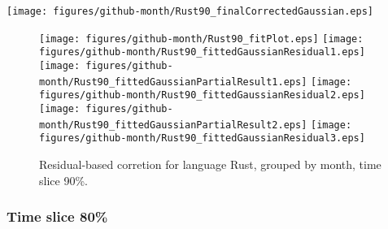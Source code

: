 \begin{center}
{\texttt{[image: figures/github-month/Rust90\_finalCorrectedGaussian.eps]}}
\end{center}

\FloatBarrier

\begin{figure}[t]
\centering
{}
{\texttt{[image: figures/github-month/Rust90\_fitPlot.eps]}}
{\texttt{[image: figures/github-month/Rust90\_fittedGaussianResidual1.eps]}}
{\texttt{[image: figures/github-month/Rust90\_fittedGaussianPartialResult1.eps]}}
{\texttt{[image: figures/github-month/Rust90\_fittedGaussianResidual2.eps]}}
{\texttt{[image: figures/github-month/Rust90\_fittedGaussianPartialResult2.eps]}}
{\texttt{[image: figures/github-month/Rust90\_fittedGaussianResidual3.eps]}}
\caption{Residual-based corretion for language Rust, grouped by month, time slice 90\%.}
\end{figure}


\FloatBarrier


\subsubsection{Time slice 80\%}

